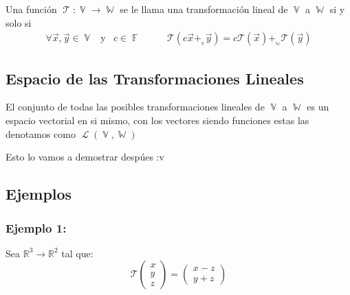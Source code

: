 \documentclass[12pt, fleqn]{report}                             %
\DeclareMathOperator \Space     {\quad}                         %
\DeclareMathOperator \MegaSpace {\quad \quad}                   %
\DeclareMathOperator \MiniSpace {\;}                            %
\newcommand \Also           {\MiniSpace \text{y} \MiniSpace}    %
\theoremstyle{break}                                            %
\DeclareMathOperator \GenericField {\mathbb{F}}                 %
\DeclareMathOperator \VectorSet    {\mathbb{V}}                 %
\DeclareMathOperator \SubVectorSet {\mathbb{W}}                 %
\DeclareMathOperator \LinTrans      {\mathcal{T}}               %
\DeclareMathOperator \Laplace       {\mathcal{L}}               %
\newcommand{\Wrap}[1]           {\left( #1 \right)}             %
\newcommand{\FnLinTrans}[1]{\mathcal{T}\Wrap{#1}}               %
\newcommand{\VecLinTrans}[1]{\mathcal{T}\pVector{#1}}           %
\newcommand{\pVector}[1]                                        %
        { \ensuremath{\begin{pmatrix}#1\end{pmatrix}} }             %
\begin{document}
            Una función $\LinTrans: \VectorSet \to \SubVectorSet$ se le llama una transformación lineal
            de $\VectorSet$ a $\SubVectorSet$ si y solo si 
            \begin{align*}
                \forall \vec x, \vec y \in \VectorSet 
                    \Also c \in \GenericField
                \MegaSpace
                \FnLinTrans{c \vec x +_{{}_{\VectorSet}} \vec y} 
                        = c\FnLinTrans{\vec x} +_{{}_{\SubVectorSet}} \FnLinTrans{\vec y}
            \end{align*}


            \vspace{1em}
            \subsection{Espacio de las Transformaciones Lineales}


                El conjunto de todas las posibles transformaciones lineales de $\VectorSet$
                a $\SubVectorSet$ es un espacio vectorial en si mismo, con los vectores
                siendo funciones estas las denotamos como $\Laplace(\VectorSet, \SubVectorSet)$

                Esto lo vamos a demostrar despúes :v




            \clearpage
            \subsection{Ejemplos}

                \subsubsection{Ejemplo 1:}
                    Sea $\mathbb{R}^3 \to \mathbb{R}^2$ tal que:
                    \begin{equation*}
                        \VecLinTrans{x\\y\\z}  = \pVector{x-z\\y+z}
                    \end{equation*}
\end{document}
